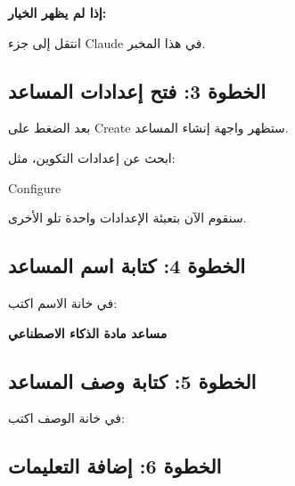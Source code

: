\documentclass[a4paper]{article}
\begin{document}
\textbf{إذا لم يظهر الخيار:}

انتقل إلى جزء Claude في هذا المخبر.



\subsection*{\khatt الخطوة 3: فتح إعدادات المساعد}

بعد الضغط على
\textenglish{Create}
ستظهر واجهة إنشاء المساعد.

ابحث عن إعدادات التكوين، مثل:

\begin{center}

\textenglish{Configure}
\end{center}

سنقوم الآن بتعبئة الإعدادات واحدة تلو الأخرى.



\subsection*{\khatt الخطوة 4: كتابة اسم المساعد}

في خانة الاسم اكتب:

\begin{center}

\textbf{مساعد مادة الذكاء الاصطناعي}

\end{center}



\subsection*{\khatt الخطوة 5: كتابة وصف المساعد}

في خانة الوصف اكتب:

\begin{center}


\end{center}



\subsection*{\khatt الخطوة 6: إضافة التعليمات}
\end{document}

